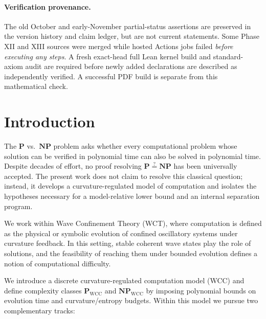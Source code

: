 \documentclass[12pt]{article}
\theoremstyle{remark}
\begin{document}
\paragraph{Verification provenance.}
The old October and early-November
partial-status assertions are preserved
in the version history and claim ledger,
but are not current statements.
Some Phase XII and XIII sources were
merged while hosted Actions jobs
failed \emph{before executing any steps}.
A fresh exact-head full Lean kernel
build and standard-axiom audit are
required before newly added declarations
are described as independently verified.
A successful PDF build is separate
from this mathematical check.

\section{Introduction}
The $\mathbf{P}$ vs.\ $\mathbf{NP}$ problem asks whether every computational problem
whose solution can be verified in polynomial time can also be solved in
polynomial time. Despite decades of effort, no proof resolving
$\mathbf{P} \stackrel{?}{=} \mathbf{NP}$ has been universally accepted.
The present work does not claim to resolve this classical question; instead,
it develops a curvature-regulated model of computation and isolates
the hypotheses necessary for a model-relative lower bound and an internal
separation program.

We work within Wave Confinement Theory (WCT), where computation is defined as
the physical or symbolic evolution of confined oscillatory systems under
curvature feedback. In this setting, stable coherent wave states play the
role of solutions, and the feasibility of reaching them under bounded
evolution defines a notion of computational difficulty.

We introduce a discrete curvature-regulated computation model (WCC) and
define complexity classes $\mathbf{P}_{\mathrm{WCC}}$ and $\mathbf{NP}_{\mathrm{WCC}}$ by
imposing polynomial bounds on evolution time and curvature/entropy budgets.
Within this model we pursue two complementary tracks:
\end{document}
